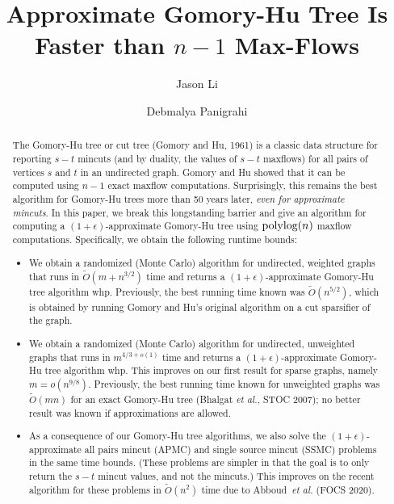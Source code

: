 \documentclass[sigconf,screen]{acmart}
\title{Approximate Gomory-Hu Tree Is Faster than $n-1$ Max-Flows}
\author{Jason Li}
\affiliation{%
  \institution{Carnegie Mellon University}
  \streetaddress{TODO}
  \city{Pittsburgh}
  \state{PA}
  \country{USA}
}
\author{Debmalya Panigrahi}%
\affiliation{%
  \institution{Duke University}
  \streetaddress{TODO}
  \city{Durham}
  \state{NC}
  \country{USA}
}
\newcommand{\e}{\epsilon}
\newcommand{\1}{\mathbbm 1}
\newcommand{\polylog}{\textup{polylog}}
\newcommand{\tO}{\tilde{O}}
\newcommand{\ssc}{{\sc SSMC}\xspace}
\newcommand{\apc}{{\sc APMC}\xspace}
\begin{document}
\begin{abstract}
    The Gomory-Hu tree or cut tree (Gomory and Hu, 1961) is a classic data structure for reporting $s-t$ mincuts (and by duality, the values of $s-t$ maxflows) for all pairs of vertices $s$ and $t$ in an undirected graph. Gomory and Hu showed that it can be computed using $n-1$ exact maxflow computations. Surprisingly, this remains the best algorithm for Gomory-Hu trees more than 50 years later, {\em even for approximate mincuts}. In this paper, we break this longstanding barrier and give an algorithm for computing a $(1+\e)$-approximate Gomory-Hu tree using $\polylog(n)$ maxflow computations. Specifically, we obtain the following runtime bounds:
    \begin{itemize}
        \item We obtain a randomized (Monte Carlo) algorithm for undirected, weighted graphs that runs in $\tO(m + n^{3/2})$ time and returns a $(1+\e)$-approximate Gomory-Hu tree algorithm whp. Previously, the best running time known was $\tO(n^{5/2})$, which is obtained by running Gomory and Hu's original algorithm on a cut sparsifier of the graph.
        \item We obtain a randomized (Monte Carlo) algorithm for undirected, unweighted graphs that runs in $m^{4/3+o(1)}$ time and returns a $(1+\e)$-approximate Gomory-Hu tree algorithm whp. This improves on our first result for sparse graphs, namely $m = o(n^{9/8})$. Previously, the best running time known for unweighted graphs was $\tO(mn)$ for an exact Gomory-Hu tree (Bhalgat {\em et al.}, STOC 2007); no better result was known if approximations are allowed.
        \item As a consequence of our Gomory-Hu tree algorithms, we also solve the $(1+\e)$-approximate all pairs mincut (\apc) and single source mincut (\ssc) problems in the same time bounds. (These problems are simpler in that the goal is to only return the $s-t$ mincut values, and not the mincuts.) This improves on the recent algorithm for these problems in $\tO(n^2)$ time due to Abboud~{\em et al.} (FOCS 2020).
    \end{itemize}
\end{abstract}

\acmPrice{}
\end{document}
